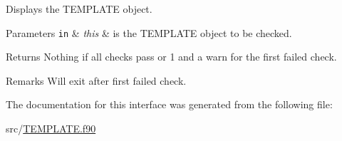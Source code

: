 Displays the T\+E\+M\+P\+L\+A\+T\+E object. 


\begin{DoxyParams}[1]{Parameters}
\mbox{\tt in}  & {\em this} & is the T\+E\+M\+P\+L\+A\+T\+E object to be checked. \\
\hline
\end{DoxyParams}
\begin{DoxyReturn}{Returns}
Nothing if all checks pass or 1 and a warn for the first failed check. 
\end{DoxyReturn}
\begin{DoxyRemark}{Remarks}
Will exit after first failed check. 
\end{DoxyRemark}


The documentation for this interface was generated from the following file\+:\begin{DoxyCompactItemize}
\item 
src/\hyperlink{_t_e_m_p_l_a_t_e_8f90}{T\+E\+M\+P\+L\+A\+T\+E.\+f90}\end{DoxyCompactItemize}
